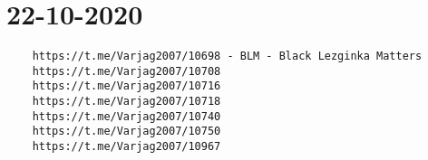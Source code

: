  
 

\section{22-10-2020}




\begin{verbatim}
	https://t.me/Varjag2007/10698 - BLM - Black Lezginka Matters
	https://t.me/Varjag2007/10708
	https://t.me/Varjag2007/10716
	https://t.me/Varjag2007/10718
	https://t.me/Varjag2007/10740
	https://t.me/Varjag2007/10750
	https://t.me/Varjag2007/10967
\end{verbatim}
